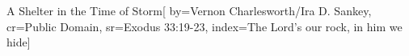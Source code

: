 {A Shelter in the Time of Storm}[
    by={Vernon Charlesworth/Ira D. Sankey},
    cr={Public Domain},
    sr={Exodus 33:19-23},
    index={The Lord's our rock, in him we hide}]
